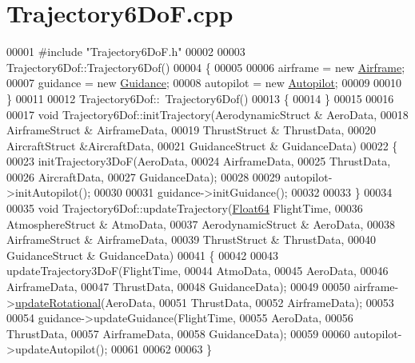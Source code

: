 \hypertarget{_trajectory6_do_f_8cpp_source}{}\section{Trajectory6\+Do\+F.\+cpp}
\label{_trajectory6_do_f_8cpp_source}

\begin{DoxyCode}
00001 \textcolor{preprocessor}{#include "Trajectory6DoF.h"}
00002 
00003 Trajectory6Dof::Trajectory6Dof() 
00004 \{
00005     
00006     airframe = \textcolor{keyword}{new} \hyperlink{group___airframe_class_airframe}{Airframe};
00007     guidance = \textcolor{keyword}{new} \hyperlink{class_guidance}{Guidance};
00008     autopilot = \textcolor{keyword}{new} \hyperlink{class_autopilot}{Autopilot};
00009 
00010 \}
00011 
00012 Trajectory6Dof::~Trajectory6Dof()
00013 \{
00014 \}
00015 
00016 
00017 \textcolor{keywordtype}{void} Trajectory6Dof::initTrajectory(AerodynamicStruct & AeroData,
00018                                     AirframeStruct & AirframeData,
00019                                     ThrustStruct & ThrustData,
00020                                     AircraftStruct &AircraftData,
00021                                     GuidanceStruct & GuidanceData)
00022 \{
00023     initTrajectory3DoF(AeroData,
00024         AirframeData,
00025         ThrustData,
00026         AircraftData,
00027         GuidanceData);
00028 
00029     autopilot->initAutopilot();
00030 
00031     guidance->initGuidance();
00032     
00033 \}
00034 
00035 \textcolor{keywordtype}{void} Trajectory6Dof::updateTrajectory(\hyperlink{group___tools_ga3f1431cb9f76da10f59246d1d743dc2c}{Float64} FlightTime,
00036                                         AtmosphereStruct & AtmoData,
00037                                         AerodynamicStruct & AeroData,
00038                                         AirframeStruct & AirframeData,
00039                                         ThrustStruct & ThrustData,
00040                                         GuidanceStruct & GuidanceData)
00041 \{
00042 
00043     updateTrajectory3DoF(FlightTime,
00044                         AtmoData,
00045                         AeroData,
00046                         AirframeData,
00047                         ThrustData,
00048                         GuidanceData);
00049 
00050     airframe->\hyperlink{group___airframe_acf8ce5ef44d07ca8815ca36d13cffcc7}{updateRotational}(AeroData,
00051                                 ThrustData,
00052                                 AirframeData);
00053 
00054     guidance->updateGuidance(FlightTime,
00055                             AeroData,
00056                             ThrustData,
00057                             AirframeData,
00058                             GuidanceData);
00059 
00060     autopilot->updateAutopilot();
00061 
00062 
00063 \}
\end{DoxyCode}
